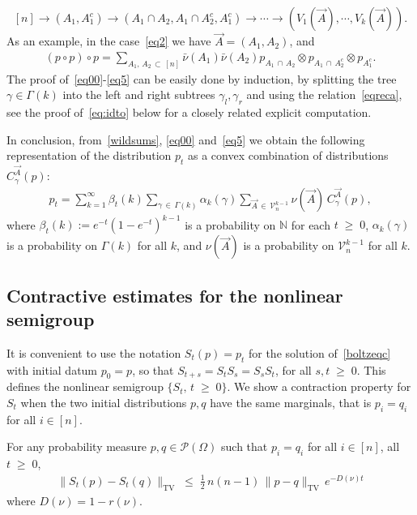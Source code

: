 \documentclass[AHL,Unicode,longabstracts,published]{cedram}
\renewcommand{\leq}{\;\leqslant\;}
\renewcommand{\geq}{\;\geqslant\;}
\newcommand{\tv}{\mathrm{TV}}
\newcommand{\cP}{\mathcal{P}}
\newcommand{\cV}{\mathcal{V}}
\newcommand{\bbN}{\mathbb{N}}
\let\b=\beta
\let\g=\gamma
\let\G=\Gamma
\let\O=\Omega
\begin{document}
\[
[n]\to (A_1,A_1^c) \to (A_1\cap A_2,A_1\cap A_2^c,A_1^c)\to\cdots\to \left(V_1(\vec A),\cdots,V_k(\vec A)\right).
\]
As an example, in the case~\eqref{eq2} we have $\vec A=(A_1,A_2)$, and
\begin{align}
(p \circ p)\circ p = \sum_{A_1,\,A_2 \,\subset\,[n]}\bar\nu(A_1)\bar\nu(A_2)p_{A_1\,\cap\,A_2}\otimes p_{A_1\,\cap\,A_2^c} \otimes p_{A_1^c}.
\end{align}
The proof of~\eqref{eq00}-\eqref{eq5} can be easily done by induction, by splitting the tree $\g\in\G(k)$ into the left and right subtrees $\g_l,\g_r$ and using the relation~\eqref{eqreca}, see the proof of~\eqref{eq:idto} below for a closely related explicit computation.

In conclusion, from~\eqref{wildsums}, \eqref{eq00} and~\eqref{eq5} we obtain the following representation of the distribution $p_t$ as a convex combination of distributions $C^{\vec A}_{\gamma}(p)$:
\begin{align}\label{eq0}
p_t=\sum_{k=1}^{\infty}\b_t(k)\sum_{\g\,\in \,\Gamma(k)}\alpha_k(\g)\sum_{\vec A\,\in\, \cV_n^{k-1}}\nu(\vec A) \,C^{\vec A}_{\gamma}(p),
\end{align}
where $\b_t(k) := e^{-t}(1-e^{-t})^{k-1}$ is a probability on $\bbN$ for each $t\geq 0$, $ \alpha_k(\g)$ is a probability on $\G(k)$ for all $k$, and $\nu(\vec A)$ is a probability on $\cV_n^{k-1}$ for all $k$.


\subsection{Contractive estimates for the nonlinear semigroup}

It is convenient to use the notation $S_t(p)=p_t$ for the solution of~\eqref{boltzeqc} with initial datum $p_0=p$, so that $S_{t+s}=S_tS_s=S_sS_t$, for all $s,t\geq 0$. This defines the nonlinear semigroup $\{S_t, \,t\geq 0\}$. We show a contraction property for $S_t$ when the two initial distributions $p,q$ have the same marginals, that is $p_i=q_i$ for all $i \in [n]$.

\begin{theorem}\label{contrlemma2}
For any probability measure $p,q \in \cP(\O)$ such that $p_{i} = q_{i}$ for all $i \in [n]$, all $t\geq 0$,
\begin{align}\label{nonlincont1}
\|S_t(p)-S_t(q)\|_\tv \leq \tfrac12\,n(n-1)\,\|p-q\|_\tv \,e^{-D(\nu) t}
\end{align}
where $D(\nu)=1-r(\nu)$.
\end{theorem}
\end{document}
